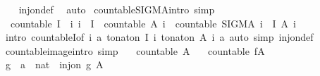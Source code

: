 \begin{isabellebody}
%
\isadelimproof
\ \ %
\endisadelimproof
%
\isatagproof
{}\isamarkupfalse%
\ inj{\isacharunderscore}on{\isacharunderscore}def\ \isamarkupfalse%
\ auto%
\endisatagproof
{\isafoldproof}%
%
\isadelimproof
%
\endisadelimproof
%
\isadelimdocument
%
\endisadelimdocument
%
\isatagdocument
%
\isamarkuptrue%
%
\endisatagdocument
{\isafolddocument}%
%
\isadelimdocument
%
\endisadelimdocument
{}\isamarkupfalse%
\ countable{\isacharunderscore}SIGMA{\isacharbrackleft}intro{\isacharcomma}\ simp{\isacharbrackright}{\isacharcolon}\isanewline
\ \ {\isachardoublequoteopen}countable\ I\ {\isasymLongrightarrow}\ {\isacharparenleft}{\isasymAnd}i{\isachardot}\ i\ {\isasymin}\ I\ {\isasymLongrightarrow}\ countable\ {\isacharparenleft}A\ i{\isacharparenright}{\isacharparenright}\ {\isasymLongrightarrow}\ countable\ {\isacharparenleft}SIGMA\ i\ {\isacharcolon}\ I{\isachardot}\ A\ i{\isacharparenright}{\isachardoublequoteclose}\isanewline
%
\isadelimproof
\ \ %
\endisadelimproof
%
\isatagproof
{}\isamarkupfalse%
\ {\isacharparenleft}intro\ countableI{\isacharprime}{\isacharbrackleft}of\ {\isachardoublequoteopen}{\isasymlambda}{\isacharparenleft}i{\isacharcomma}\ a{\isacharparenright}{\isachardot}\ {\isacharparenleft}to{\isacharunderscore}nat{\isacharunderscore}on\ I\ i{\isacharcomma}\ to{\isacharunderscore}nat{\isacharunderscore}on\ {\isacharparenleft}A\ i{\isacharparenright}\ a{\isacharparenright}{\isachardoublequoteclose}{\isacharbrackright}{\isacharparenright}\ {\isacharparenleft}auto\ simp{\isacharcolon}\ inj{\isacharunderscore}on{\isacharunderscore}def{\isacharparenright}%
\endisatagproof
{\isafoldproof}%
%
\isadelimproof
\isanewline
%
\endisadelimproof
\isanewline
{}\isamarkupfalse%
\ countable{\isacharunderscore}image{\isacharbrackleft}intro{\isacharcomma}\ simp{\isacharbrackright}{\isacharcolon}\isanewline
\ \ \ {\isachardoublequoteopen}countable\ A{\isachardoublequoteclose}\isanewline
\ \ \ {\isachardoublequoteopen}countable\ {\isacharparenleft}f{\isacharbackquote}A{\isacharparenright}{\isachardoublequoteclose}\isanewline
%
\isadelimproof
%
\endisadelimproof
%
\isatagproof
{}\isamarkupfalse%
\ {\isacharminus}\isanewline
\ \ \isamarkupfalse%
\ g\ {\isacharcolon}{\isacharcolon}\ {\isachardoublequoteopen}{\isacharprime}a\ {\isasymRightarrow}\ nat{\isachardoublequoteclose}\ \ {\isachardoublequoteopen}inj{\isacharunderscore}on\ g\ A{\isachardoublequoteclose}\isanewline

\end{isabellebody}
